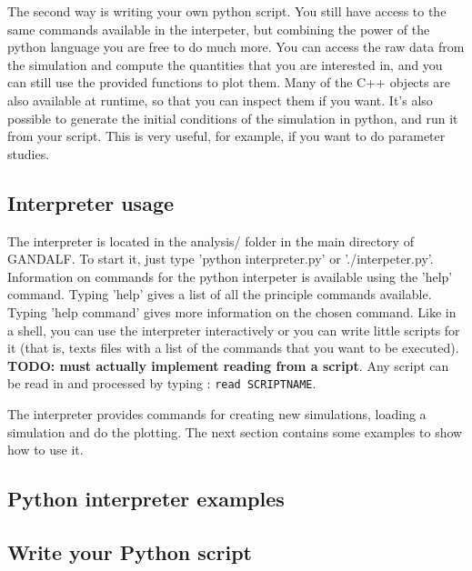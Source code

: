 \documentclass[a4paper]{article}
\newcommand{\var}[1]{\texttt{#1}}
\begin{document}
The second way is writing your own python script. You still have access to the same commands available in the interpeter, but combining the power of the python language you are free to do much more. You can access the raw data from the simulation and compute the quantities that you are interested in, and you can still use the provided functions to plot them. Many of the C++ objects are also available at runtime, so that you can inspect them if you want. It's also possible to generate the initial conditions of the simulation in python, and run it from your script. This is very useful, for example, if you want to do parameter studies.


\subsection{Interpreter usage}

The interpreter is located in the analysis/ folder in the main directory of GANDALF. To start it, just type 'python interpreter.py' or './interpeter.py'.
Information on commands for the python interpeter is available using the 'help' command.  Typing 'help' gives a list of all the principle commands available.  Typing 'help command' gives more information on the chosen command.
Like in a shell, you can use the interpreter interactively or you can write little scripts for it (that is, texts files with a list of the commands that you want to be executed). \textbf{TODO: must actually implement reading from a script}. Any script can be read in and processed by typing : \var{read SCRIPTNAME}.

The interpreter provides commands for creating new simulations, loading a simulation and do the plotting. The next section contains some examples to show how to use it.



\subsection{Python interpreter examples}



\subsection{Write your Python script}
\end{document}
